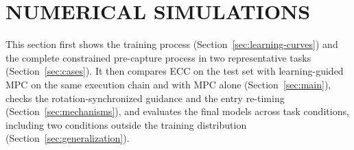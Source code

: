 \section{NUMERICAL SIMULATIONS}\label{sec:experiments}

This section first shows the training process (Section~\ref{sec:learning-curves}) and the complete constrained pre-capture process in two representative tasks (Section~\ref{sec:cases}). It then compares ECC on the test set with learning-guided MPC on the same execution chain and with MPC alone (Section~\ref{sec:main}), checks the rotation-synchronized guidance and the entry re-timing (Section~\ref{sec:mechanisms}), and evaluates the final models across task conditions, including two conditions outside the training distribution (Section~\ref{sec:generalization}).

